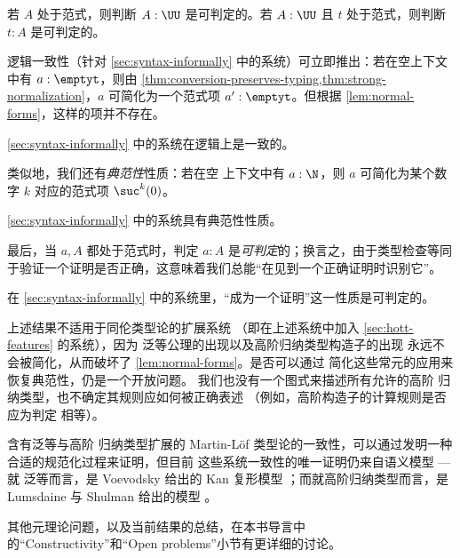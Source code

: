 \begin{thm}
  若 $A$ 处于范式，则判断
  $A : \UU$ 是可判定的。若 $A : \UU$ 且 $t$ 处于范式，则判断
  $t:A$ 是可判定的。
\end{thm}

逻辑一致性（针对 \cref{sec:syntax-informally} 中的系统）可立即推出：若在空上下文中有 $a:\emptyt$，则由
\cref{thm:conversion-preserves-typing,thm:strong-normalization}，$a$
可简化为一个范式项 $a':\emptyt$。但根据
\cref{lem:normal-forms}，这样的项并不存在。

\begin{cor}
 \cref{sec:syntax-informally} 中的系统在逻辑上是一致的。
\end{cor}

类似地，我们还有\emph{典范性}性质：若在空
上下文中有 $a:\N$，则 $a$ 可简化为某个数字 $k$ 对应的范式项 $\suc^k(0)$。

\begin{cor}
 \cref{sec:syntax-informally} 中的系统具有典范性性质。
\end{cor}

最后，当 $a,A$ 都处于范式时，判定 $a:A$ 是\emph{可判定}的；换言之，由于类型检查等同于验证一个证明是否正确，这意味着我们总能“在见到一个正确证明时识别它”。

\begin{cor}
在 \cref{sec:syntax-informally} 中的系统里，“成为一个证明”这一性质是可判定的。
\end{cor}

\mentalpause

上述结果不适用于同伦类型论的扩展系统
（即在上述系统中加入 \cref{sec:hott-features} 的系统），因为
泛等公理的出现以及高阶归纳类型构造子的出现
永远不会被简化，从而破坏了 \cref{lem:normal-forms}。是否可以通过
简化这些常元的应用来恢复典范性，仍是一个开放问题。
我们也没有一个图式来描述所有允许的高阶
归纳类型，也不确定其规则应如何被正确表述
（例如，高阶构造子的计算规则是否应为判定
相等）。

含有泛等与高阶
归纳类型扩展的 Martin-L\"{o}f 类型论的一致性，可以通过发明一种合适的规范化过程来证明，但目前
这些系统一致性的唯一证明仍来自语义模型 --- 就
泛等而言，是 Voevodsky 给出的 Kan 复形模型 \cite{klv:ssetmodel}；而就高阶归纳类型而言，是 Lumsdaine 与 Shulman 给出的模型 \cite{ls:hits}。

其他元理论问题，以及当前结果的总结，在本书导言中的“Constructivity”和“Open problems”小节有更详细的讨论。

%

